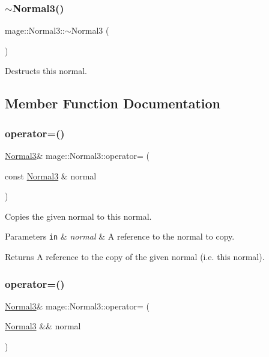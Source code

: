 \subsubsection{\texorpdfstring{$\sim$\+Normal3()}{~Normal3()}}
{\footnotesize\ttfamily mage\+::\+Normal3\+::$\sim$\+Normal3 (\begin{DoxyParamCaption}{ }\end{DoxyParamCaption})\hspace{0.3cm}{\ttfamily [default]}}

Destructs this normal. 

\subsection{Member Function Documentation}
\hypertarget{structmage_1_1_normal3_ade86357989ceaecf1b22bb9e53ca7fed}{}\label{structmage_1_1_normal3_ade86357989ceaecf1b22bb9e53ca7fed} 
\subsubsection{\texorpdfstring{operator=()}{operator=()}\hspace{0.1cm}{\footnotesize\ttfamily [1/2]}}
{\footnotesize\ttfamily \hyperlink{structmage_1_1_normal3}{Normal3}\& mage\+::\+Normal3\+::operator= (\begin{DoxyParamCaption}\item[{const \hyperlink{structmage_1_1_normal3}{Normal3} \&}]{normal }\end{DoxyParamCaption})}

Copies the given normal to this normal.


\begin{DoxyParams}[1]{Parameters}
\mbox{\tt in}  & {\em normal} & A reference to the normal to copy. \\
\hline
\end{DoxyParams}
\begin{DoxyReturn}{Returns}
A reference to the copy of the given normal (i.\+e. this normal). 
\end{DoxyReturn}
\hypertarget{structmage_1_1_normal3_a74cd3988b2ee23a0a76a5f7d6d5d7f3f}{}\label{structmage_1_1_normal3_a74cd3988b2ee23a0a76a5f7d6d5d7f3f} 
\subsubsection{\texorpdfstring{operator=()}{operator=()}\hspace{0.1cm}{\footnotesize\ttfamily [2/2]}}
{\footnotesize\ttfamily \hyperlink{structmage_1_1_normal3}{Normal3}\& mage\+::\+Normal3\+::operator= (\begin{DoxyParamCaption}\item[{\hyperlink{structmage_1_1_normal3}{Normal3} \&\&}]{normal }\end{DoxyParamCaption})}

